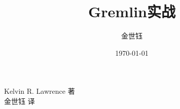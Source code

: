 \documentclass[UTF8]{ctexart}
\title{Gremlin实战}
\author{金世钰}
\date{\today}
\begin{document}
\maketitle

\begin{flushright}
Kelvin R. Lawrence {}著\\
金世钰{ }译
\end{flushright}
\end{document}
